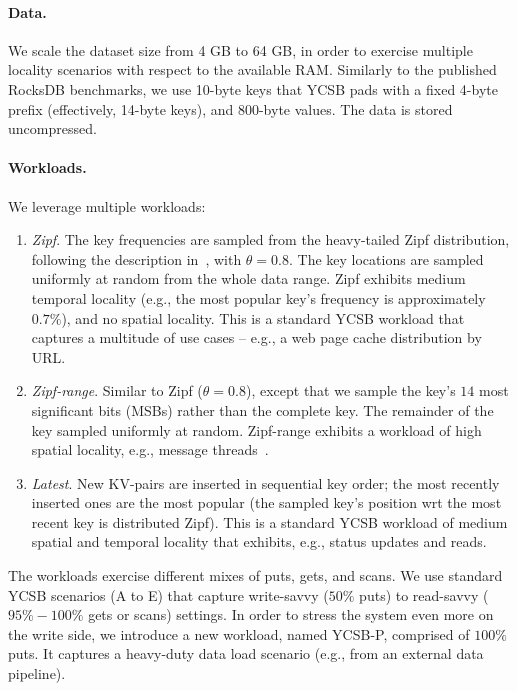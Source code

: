\paragraph{Data.} We scale the dataset size from 4 GB to 64 GB, in order to exercise multiple locality 
scenarios with respect to the available RAM. Similarly to the published RocksDB benchmarks, we use 
10-byte keys that YCSB pads with a fixed 4-byte prefix (effectively, 14-byte keys), and 800-byte values. 
The data is stored uncompressed. 

\paragraph{Workloads.} We leverage multiple workloads: 

\begin{enumerate}
\item {\em Zipf}. The key frequencies are sampled from the heavy-tailed Zipf distribution, 
following the description in~\cite{Gray:1994:QGB:191839.191886}, with $\theta = 0.8$. 
The key locations are sampled uniformly at random from the whole data range. Zipf exhibits 
medium temporal locality (e.g., the most popular key's frequency is approximately $0.7\%$), 
and no spatial locality. This is a standard YCSB workload that captures a multitude of use cases 
-- e.g., a web page cache distribution by URL. 

\item {\em Zipf-range}. Similar to Zipf ($\theta=0.8$), except that we sample the key's $14$ most significant bits
(MSBs) rather than the complete key. The remainder of the key sampled uniformly at random. Zipf-range exhibits
a workload of high spatial locality, e.g., message threads~\cite{Borthakur:2011:AHG:1989323.1989438}. 

\item {\em Latest}. New KV-pairs are inserted in sequential key order; the most recently inserted ones are 
the  most popular (the sampled key's position wrt the most recent key is distributed Zipf). This is a 
standard YCSB workload of medium spatial and temporal locality that exhibits, e.g., status updates and reads. 

\end{enumerate}

The workloads exercise different mixes of puts, gets, and scans. We use standard YCSB scenarios 
(A to E) that capture write-savvy ($50\%$ puts) to read-savvy ($95\%-100\%$ gets or scans) settings. 
In order to stress the system even more on the write side, we introduce a new workload, named 
YCSB-P, comprised of $100\%$ puts. It captures a heavy-duty data load scenario (e.g., from an 
external data pipeline). 

